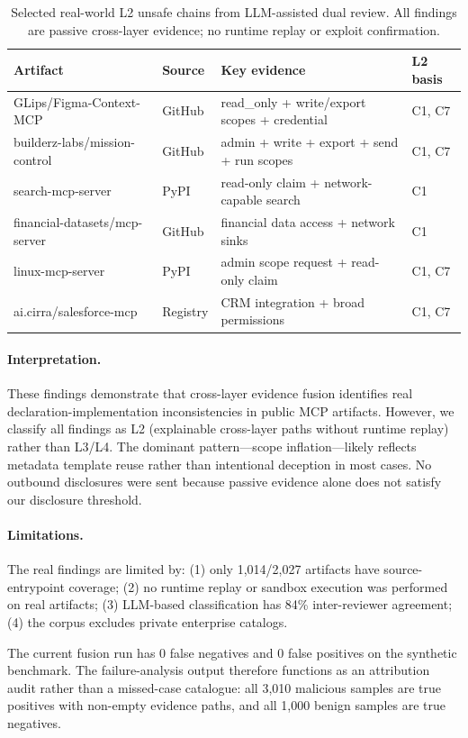 \documentclass[10pt]{article}
\begin{document}
\begin{table}[t]
\centering
\caption{Selected real-world L2 unsafe chains from LLM-assisted dual review. All findings are passive cross-layer evidence; no runtime replay or exploit confirmation.}
\label{tab:real_unsafe_chains}
\begin{tabular}{llp{4cm}l}
\toprule
Artifact & Source & Key evidence & L2 basis \\
\midrule
GLips/Figma-Context-MCP & GitHub & read\_only + write/export scopes + credential & C1, C7 \\
builderz-labs/mission-control & GitHub & admin + write + export + send + run scopes & C1, C7 \\
search-mcp-server & PyPI & read-only claim + network-capable search & C1 \\
financial-datasets/mcp-server & GitHub & financial data access + network sinks & C1 \\
linux-mcp-server & PyPI & admin scope request + read-only claim & C1, C7 \\
ai.cirra/salesforce-mcp & Registry & CRM integration + broad permissions & C1, C7 \\
\bottomrule
\end{tabular}
\end{table}

\paragraph{Interpretation.}
These findings demonstrate that cross-layer evidence fusion identifies real declaration-implementation inconsistencies in public MCP artifacts. However, we classify all findings as L2 (explainable cross-layer paths without runtime replay) rather than L3/L4. The dominant pattern---scope inflation---likely reflects metadata template reuse rather than intentional deception in most cases. No outbound disclosures were sent because passive evidence alone does not satisfy our disclosure threshold.

\paragraph{Limitations.}
The real findings are limited by: (1) only 1{,}014/2{,}027 artifacts have source-entrypoint coverage; (2) no runtime replay or sandbox execution was performed on real artifacts; (3) LLM-based classification has 84\% inter-reviewer agreement; (4) the corpus excludes private enterprise catalogs.

The current fusion run has 0 false negatives and 0 false positives on the synthetic benchmark. The failure-analysis output therefore functions as an attribution audit rather than a missed-case catalogue: all 3{,}010 malicious samples are true positives with non-empty evidence paths, and all 1{,}000 benign samples are true negatives.
\end{document}
